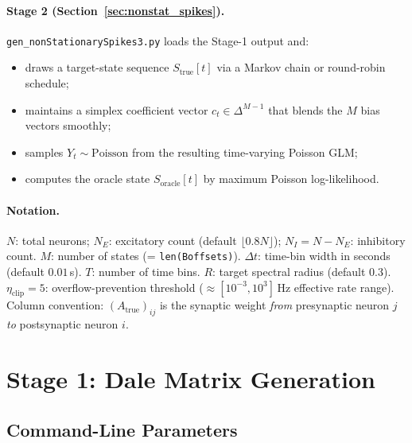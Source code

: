 \documentclass[11pt]{article}
\begin{document}
\paragraph{Stage 2 (Section~\ref{sec:nonstat_spikes}).}
\texttt{gen\_nonStationarySpikes3.py} loads the Stage-1 output and:
\begin{itemize}
  \item draws a target-state sequence $S_{\text{true}}[t]$
        via a Markov chain or round-robin schedule;
  \item maintains a simplex coefficient vector $c_t \in \Delta^{M-1}$
        that blends the $M$ bias vectors smoothly;
  \item samples $Y_t \sim \mathrm{Poisson}$ from the resulting
        time-varying Poisson GLM;
  \item computes the oracle state $S_{\text{oracle}}[t]$ by
        maximum Poisson log-likelihood.
\end{itemize}

\paragraph{Notation.}
$N$: total neurons; $N_E$: excitatory count (default $\lfloor 0.8N \rfloor$);
$N_I = N - N_E$: inhibitory count.
$M$: number of states (= \texttt{len(Boffsets)}).
$\Delta t$: time-bin width in seconds (default $0.01$\,s).
$T$: number of time bins.
$R$: target spectral radius (default $0.3$).
$\eta_{\mathrm{clip}} = 5$: overflow-prevention threshold
($\approx [10^{-3}, 10^3]$\,Hz effective rate range).
Column convention: $(A_{\text{true}})_{ij}$ is the synaptic weight
\emph{from} presynaptic neuron $j$ \emph{to} postsynaptic neuron $i$.

\section{Stage 1: Dale Matrix Generation}
\label{sec:dale_matrices}

\subsection{Command-Line Parameters}
\end{document}
